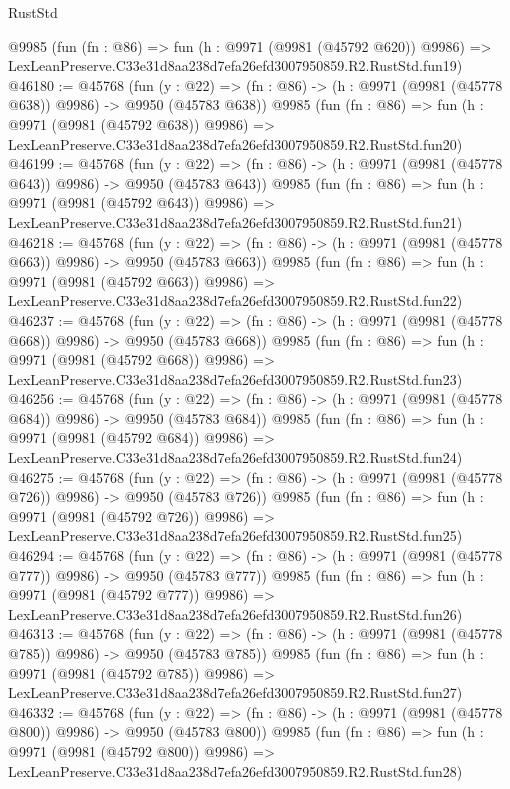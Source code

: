 \begin{lexlean}{RustStd}
\begin{coremodule}
    @9985
    (fun (fn : @86) =>
    fun (h : @9971 (@9981 (@45792 @620)) @9986) =>
    LexLeanPreserve.C33e31d8aa238d7efa26efd3007950859.R2.RustStd.fun19)
@46180 := @45768
    (fun (y : @22) => (fn : @86) -> (h : @9971 (@9981 (@45778 @638)) @9986) -> @9950 (@45783 @638))
    @9985
    (fun (fn : @86) =>
    fun (h : @9971 (@9981 (@45792 @638)) @9986) =>
    LexLeanPreserve.C33e31d8aa238d7efa26efd3007950859.R2.RustStd.fun20)
@46199 := @45768
    (fun (y : @22) => (fn : @86) -> (h : @9971 (@9981 (@45778 @643)) @9986) -> @9950 (@45783 @643))
    @9985
    (fun (fn : @86) =>
    fun (h : @9971 (@9981 (@45792 @643)) @9986) =>
    LexLeanPreserve.C33e31d8aa238d7efa26efd3007950859.R2.RustStd.fun21)
@46218 := @45768
    (fun (y : @22) => (fn : @86) -> (h : @9971 (@9981 (@45778 @663)) @9986) -> @9950 (@45783 @663))
    @9985
    (fun (fn : @86) =>
    fun (h : @9971 (@9981 (@45792 @663)) @9986) =>
    LexLeanPreserve.C33e31d8aa238d7efa26efd3007950859.R2.RustStd.fun22)
@46237 := @45768
    (fun (y : @22) => (fn : @86) -> (h : @9971 (@9981 (@45778 @668)) @9986) -> @9950 (@45783 @668))
    @9985
    (fun (fn : @86) =>
    fun (h : @9971 (@9981 (@45792 @668)) @9986) =>
    LexLeanPreserve.C33e31d8aa238d7efa26efd3007950859.R2.RustStd.fun23)
@46256 := @45768
    (fun (y : @22) => (fn : @86) -> (h : @9971 (@9981 (@45778 @684)) @9986) -> @9950 (@45783 @684))
    @9985
    (fun (fn : @86) =>
    fun (h : @9971 (@9981 (@45792 @684)) @9986) =>
    LexLeanPreserve.C33e31d8aa238d7efa26efd3007950859.R2.RustStd.fun24)
@46275 := @45768
    (fun (y : @22) => (fn : @86) -> (h : @9971 (@9981 (@45778 @726)) @9986) -> @9950 (@45783 @726))
    @9985
    (fun (fn : @86) =>
    fun (h : @9971 (@9981 (@45792 @726)) @9986) =>
    LexLeanPreserve.C33e31d8aa238d7efa26efd3007950859.R2.RustStd.fun25)
@46294 := @45768
    (fun (y : @22) => (fn : @86) -> (h : @9971 (@9981 (@45778 @777)) @9986) -> @9950 (@45783 @777))
    @9985
    (fun (fn : @86) =>
    fun (h : @9971 (@9981 (@45792 @777)) @9986) =>
    LexLeanPreserve.C33e31d8aa238d7efa26efd3007950859.R2.RustStd.fun26)
@46313 := @45768
    (fun (y : @22) => (fn : @86) -> (h : @9971 (@9981 (@45778 @785)) @9986) -> @9950 (@45783 @785))
    @9985
    (fun (fn : @86) =>
    fun (h : @9971 (@9981 (@45792 @785)) @9986) =>
    LexLeanPreserve.C33e31d8aa238d7efa26efd3007950859.R2.RustStd.fun27)
@46332 := @45768
    (fun (y : @22) => (fn : @86) -> (h : @9971 (@9981 (@45778 @800)) @9986) -> @9950 (@45783 @800))
    @9985
    (fun (fn : @86) =>
    fun (h : @9971 (@9981 (@45792 @800)) @9986) =>
    LexLeanPreserve.C33e31d8aa238d7efa26efd3007950859.R2.RustStd.fun28)

\end{coremodule}
\end{lexlean}
